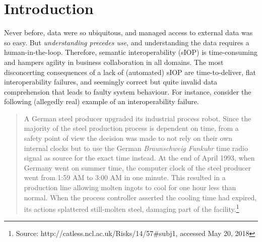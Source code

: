 \documentclass[sort&compress,preprint,authoryear,3p,twocolumn]{elsarticle}
\begin{document}
\linenumbers



\hypertarget{introduction}{%
\section{Introduction}\label{introduction}}

Never before, data were so ubiquitous, and managed access to external
data was so easy. But \emph{understanding precedes use}, and
understanding the data requires a human-in-the-loop. Therefore, semantic
interoperability (sIOP) is time-consuming and hampers agility in
business collaboration in all domains. The most disconcerting
consequences of a lack of (automated) sIOP are time-to-deliver, flat
interoperability failures, and seemingly correct but quite invalid data
comprehension that leads to faulty system behaviour. For instance,
consider the following (allegedly real) example of an interoperability
failure.

\begin{quote}
A German steel producer upgraded its industrial process robot. Since the
majority of the steel production process is dependent on time, from a
safety point of view the decision was made to not rely on their own
internal clocks but to use the German \emph{Braunschweig Funkuhr} time
radio signal as source for the exact time instead. At the end of April
1993, when Germany went on summer time, the computer clock of the steel
producer went from 1:59 AM to 3:00 AM in one minute. This resulted in a
production line allowing molten ingots to cool for one hour less than
normal. When the process controller asserted the cooling time had
expired, its actions splattered still-molten steel, damaging part of the
facility.\footnote{Source: http://catless.ncl.ac.uk/Risks/14/57\#subj1,
  accessed May 20, 2018}
\end{quote}
\end{document}
